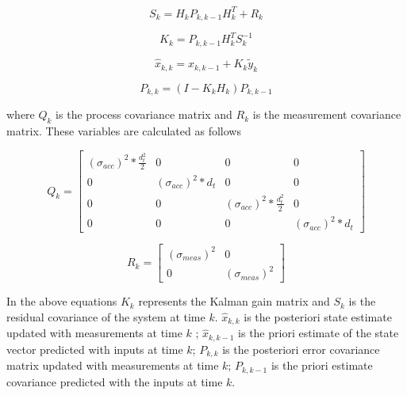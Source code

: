 \begin{equation}
S_k = H_k P_{k,k-1} H^T_k + R_k
\end{equation}

\begin{equation}
K_k =  P_{k,k-1} H^T_kS_k^{-1}
\end{equation}
		
\begin{equation}
 \hat{x}_{k,k} =  \hat{x}_{k,k-1} + K_k \tilde{y}_k
\end{equation}
		
\begin{equation}
P_{k,k} = (I - K_kH_k)P_{k,k-1}
\end{equation}
		
where $Q_k$ is the process covariance matrix and $R_k$ is the measurement covariance matrix. These variables are calculated as follows

\begin{equation}
Q_k = \begin{bmatrix}
(\sigma_{acc})^2 * \frac{d^2_t}{2} & 0  &0 &0\\
0 & (\sigma_{acc})^2 * d_t &0 &0 \\
0 &0 &(\sigma_{acc})^2 * \frac{d^2_t}{2} & 0\\
 0 &0 &0 & (\sigma_{acc})^2 * d_t
\end{bmatrix}
\end{equation}
		
\begin{equation}
R_k = \begin{bmatrix}
(\sigma_{meas})^2 & 0 \\
 0 & (\sigma_{meas})^2 
\end{bmatrix}
\end{equation}
		
In the above equations $K_k$ represents the Kalman gain matrix and $S_k$ is the residual covariance of the system at time $k$. $\hat{x}_{k,k}$ is the posteriori state estimate updated with measurements at time $k$ ;  $\hat{x}_{k,k-1}$ is the priori estimate of the state vector predicted with inputs at time $k$; $P_{k,k}$ is the posteriori error covariance matrix updated with measurements at time $k$; $P_{k,k-1}$ is the priori estimate covariance predicted with the inputs at time $k$.
			
